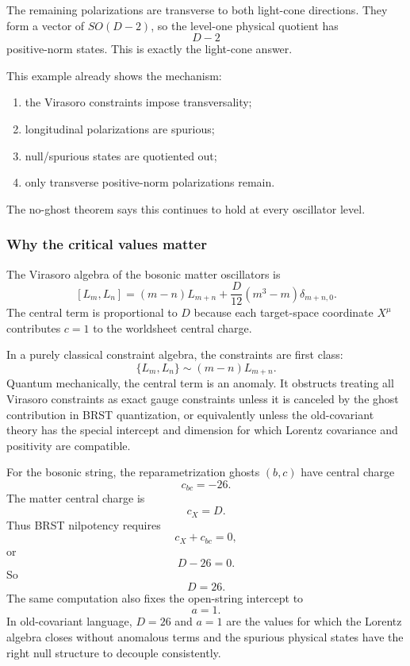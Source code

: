 \documentclass[
  10pt,
  a4paper,
  openany]{book}
\providecommand{\tightlist}{%
  \setlength{\itemsep}{0pt}\setlength{\parskip}{0pt}}
\begin{document}
The remaining polarizations are transverse to both light-cone
directions. They form a vector of \(SO(D-2)\), so the level-one physical
quotient has \[
D-2
\] positive-norm states. This is exactly the light-cone answer.

This example already shows the mechanism:

\begin{enumerate}
\def\labelenumi{\arabic{enumi}.}
\tightlist
\item
  the Virasoro constraints impose transversality;
\item
  longitudinal polarizations are spurious;
\item
  null/spurious states are quotiented out;
\item
  only transverse positive-norm polarizations remain.
\end{enumerate}

The no-ghost theorem says this continues to hold at every oscillator
level.

\subsubsection{Why the critical values
matter}\label{why-the-critical-values-matter}

The Virasoro algebra of the bosonic matter oscillators is \[
[L_m,L_n]
=
(m-n)L_{m+n}
+
\frac{D}{12}(m^3-m)\delta_{m+n,0}.
\] The central term is proportional to \(D\) because each target-space
coordinate \(X^\mu\) contributes \(c=1\) to the worldsheet central
charge.

In a purely classical constraint algebra, the constraints are first
class: \[
\{L_m,L_n\}
\sim
(m-n)L_{m+n}.
\] Quantum mechanically, the central term is an anomaly. It obstructs
treating all Virasoro constraints as exact gauge constraints unless it
is canceled by the ghost contribution in BRST quantization, or
equivalently unless the old-covariant theory has the special intercept
and dimension for which Lorentz covariance and positivity are
compatible.

For the bosonic string, the reparametrization ghosts \((b,c)\) have
central charge \[
c_{bc}=-26.
\] The matter central charge is \[
c_X=D.
\] Thus BRST nilpotency requires \[
c_X+c_{bc}=0,
\] or \[
D-26=0.
\] So \[
D=26.
\] The same computation also fixes the open-string intercept to \[
a=1.
\] In old-covariant language, \(D=26\) and \(a=1\) are the values for
which the Lorentz algebra closes without anomalous terms and the
spurious physical states have the right null structure to decouple
consistently.
\end{document}
